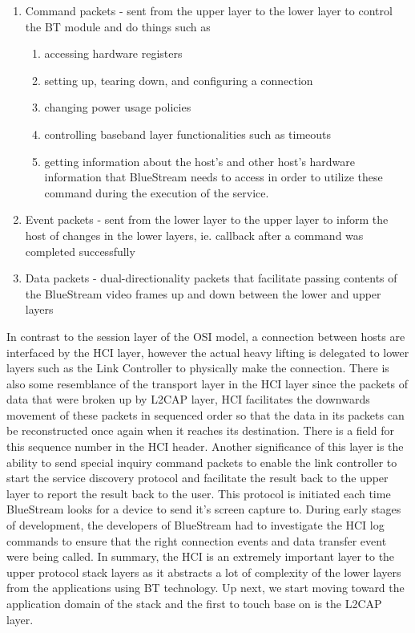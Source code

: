 \documentclass[a4paper,12pt]{article}
\begin{document}
\begin{enumerate}
\item Command packets - sent from the upper layer to the lower layer to control the BT module and do things such as
    \begin{enumerate}
    \item accessing hardware registers
    \item setting up, tearing down, and configuring a connection
    \item changing power usage policies
    \item controlling baseband layer functionalities such as timeouts
    \item getting information about the host’s and other host's hardware information that BlueStream needs to access in order to utilize these command during the execution of the service.
    \end{enumerate}
\item Event packets - sent from the lower layer to the upper layer to inform the host of changes in the lower layers, ie. callback after a command was completed successfully
\item Data packets - dual-directionality packets that facilitate passing contents of the BlueStream video frames up and down between the lower and upper layers    
\end{enumerate}

In contrast to the session layer of the OSI model, a connection between hosts are interfaced by the HCI layer, however the actual heavy lifting is delegated to lower layers such as the Link Controller to physically make the connection. There is also some resemblance of the transport layer in the HCI layer since the packets of data that were broken up by L2CAP layer, HCI facilitates the downwards movement of these packets in sequenced order so that the data in its packets can be reconstructed once again when it reaches its destination. There is a field for this sequence number in the HCI header. Another significance of this layer is the ability to send special inquiry command packets to enable the link controller to start the service discovery protocol and facilitate the result back to the upper layer to report the result back to the user. This protocol is initiated each time BlueStream looks for a device to send it’s screen capture to. During early stages of development, the developers of BlueStream had to investigate the HCI log commands to ensure that the right connection events and data transfer event were being called. In summary, the HCI is an extremely important layer to the upper protocol stack layers as it abstracts a lot of complexity of the lower layers from the applications using BT technology. Up next, we start moving toward the application domain of the stack and the first to touch base on is the L2CAP layer. 
\end{document}
